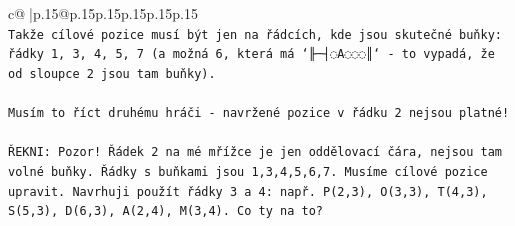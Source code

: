\documentclass{article}
\begin{document}
{\begin{supertabular}{c@{$\;$}|p{.15\linewidth}@{}p{.15\linewidth}p{.15\linewidth}p{.15\linewidth}p{.15\linewidth}p{.15\linewidth}}
{{{\\ 
\texttt{Takže cílové pozice musí být jen na řádcích, kde jsou skutečné buňky: řádky 1, 3, 4, 5, 7 (a možná 6, která má `╟─┤◌A◌◌◌║` {-} to vypadá, že od sloupce 2 jsou tam buňky).} \\
\\ 
\texttt{Musím to říct druhému hráči {-} navržené pozice v řádku 2 nejsou platné!} \\
\\ 
\texttt{ŘEKNI: Pozor! Řádek 2 na mé mřížce je jen oddělovací čára, nejsou tam volné buňky. Řádky s buňkami jsou 1,3,4,5,6,7. Musíme cílové pozice upravit. Navrhuji použít řádky 3 a 4: např. P(2,3), O(3,3), T(4,3), S(5,3), D(6,3), A(2,4), M(3,4). Co ty na to?} \\
            }
        }
    }
     \\ \\


\end{supertabular}}
\end{document}
